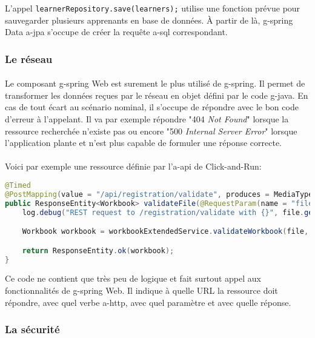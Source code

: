 L'appel \lstinline{learnerRepository.save(learners);} utilise une fonction prévue pour sauvegarder plusieurs apprenants en base de données.
À partir de là, \gls{g-spring} Data \acrshort{a-jpa} s'occupe de créer la requête \gls{a-sql} correspondant.

\subsubsection{Le réseau}
\label{subsubsec:spring-web}

\paragraph{}
Le composant \Gls{g-spring} Web est surement le plus utilisé de \gls{g-spring}.
Il permet de transformer les données reçues par le réseau en objet défini par le code \Gls{g-java}.
En cas de tout écart au scénario nominal, il s'occupe de répondre avec le bon code d'erreur à l'appelant.
Il va par exemple répondre "404 \textit{Not Found}" lorsque la ressource recherchée n'existe pas ou encore "500 \textit{Internal Server Error}" lorsque l'application plante et n'est plus capable de formuler une réponse correcte.

\paragraph{}
Voici par exemple une ressource définie par l'\gls{a-api} de Click-and-Run\fnmark{}:
\begin{lstlisting}[language=Java]
@Timed
@PostMapping(value = "/api/registration/validate", produces = MediaType.APPLICATION_JSON_UTF8_VALUE)
public ResponseEntity<Workbook> validateFile(@RequestParam(name = "file") MultipartFile file) {
    log.debug("REST request to /registration/validate with {}", file.getOriginalFilename());

    Workbook workbook = workbookExtendedService.validateWorkbook(file, new RegistrationWorkbook());

    return ResponseEntity.ok(workbook);
}
\end{lstlisting}
Ce code ne contient que très peu de logique et fait surtout appel aux fonctionnalités de \Gls{g-spring} Web. Il indique à quelle URL la ressource doit répondre, avec quel verbe \gls{a-http}, avec quel paramètre et avec quelle réponse.

\subsubsection{La sécurité}
\label{spring-boot-starter-security}

